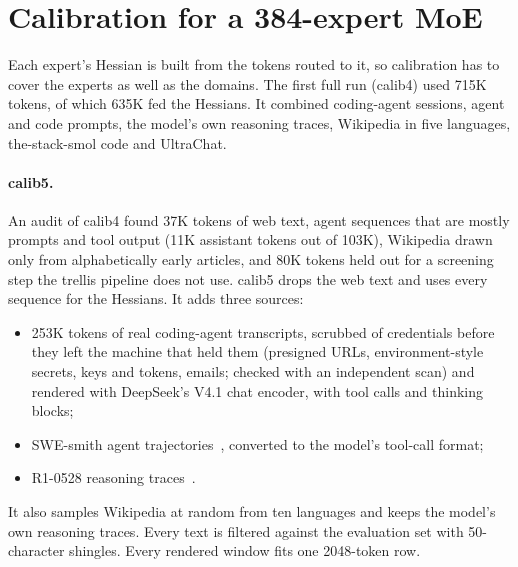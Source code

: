 \documentclass[10pt]{article}
\begin{document}
\section{Calibration for a 384-expert MoE}
\label{sec:calib}

Each expert's Hessian is built from the tokens routed to it, so calibration has to cover the experts as well as the
domains. The first full run (calib4) used 715K tokens, of which 635K fed the Hessians. It combined coding-agent
sessions, agent and code prompts, the model's own reasoning traces, Wikipedia in five languages, the-stack-smol code
and UltraChat.

\paragraph{calib5.}
An audit of calib4 found 37K tokens of web text, agent sequences that are mostly prompts and tool output (11K
assistant tokens out of 103K), Wikipedia drawn only from alphabetically early articles, and 80K tokens held out for a
screening step the trellis pipeline does not use. calib5 drops the web text and uses every sequence for the Hessians.
It adds three sources:
\begin{itemize}\setlength{\itemsep}{1pt}
\item 253K tokens of real coding-agent transcripts, scrubbed of credentials before they left the machine that held
them (presigned URLs, environment-style secrets, keys and tokens, emails; checked with an independent scan) and
rendered with DeepSeek's V4.1 chat encoder, with tool calls and thinking blocks;
\item SWE-smith agent trajectories~\cite{swesmith}, converted to the model's tool-call format;
\item R1-0528 reasoning traces~\cite{amr1}.
\end{itemize}
It also samples Wikipedia at random from ten languages and keeps the model's own reasoning traces. Every text is
filtered against the evaluation set with 50-character shingles. Every rendered window fits one 2048-token row.
\end{document}
